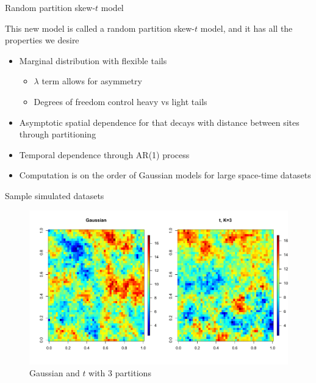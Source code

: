 \documentclass{beamer}
\begin{document}
\begin{frame}{Random partition skew-$t$ model}
\begin{adjustwidth}{1em}{0em}
  This new model is called a random partition skew-$t$ model, and it has all the properties we desire \vspace{1em}
  \begin{itemize} \setlength{\itemsep}{1em}
    \item Marginal distribution with flexible tails \vspace{0.5em}
    \begin{itemize} \setlength{\itemsep}{0.5em}
      \item $\lambda$ term allows for asymmetry
      \item Degrees of freedom control heavy vs light tails
    \end{itemize}
    \item Asymptotic spatial dependence for that decays with distance between sites through partitioning
    \item Temporal dependence through AR(1) process
    \item Computation is on the order of Gaussian models for large space-time datasets
  \end{itemize}
\end{adjustwidth}
\end{frame}

\begin{frame}{Sample simulated datasets}
  \centering
  \begin{figure}
  \includegraphics[width=1\linewidth, trim=0in 0.5in 0in 0in]{./plots/pot/gauss-vs-t3.pdf}
  \caption{Gaussian and $t$ with 3 partitions}
  \end{figure}
\end{frame}
\end{document}
